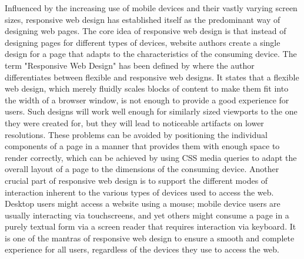 Influenced by the increasing use of mobile devices and their vastly varying screen sizes, responsive web design has established itself as the predominant way of designing web pages. 
The core idea of responsive web design is that instead of designing pages for different types of devices, website authors create a single design for a page that adapts to the characteristics of the consuming device. 
The term "Responsive Web Design" has been defined by \cite{ResponsiveWebDesign} where the author differentiates between flexible and responsive web designs. 
It states that a flexible web design, which merely fluidly scales blocks of content to make them fit into the width of a browser window, is not enough to provide a good experience for users. 
Such designs will work well enough for similarly sized viewports to the one they were created for, but they will lead to noticeable artifacts on lower resolutions. 
These problems can be avoided by positioning the individual components of a page in a manner that provides them with enough space to render correctly, which can be achieved by using CSS media queries to adapt the overall layout of a page to the dimensions of the consuming device. 
Another crucial part of responsive web design is to support the different modes of interaction inherent to the various types of devices used to access the web. 
Desktop users might access a website using a mouse; mobile device users are usually interacting via touchscreens, and yet others might consume a page in a purely textual form via a screen reader that requires interaction via keyboard. 
It is one of the mantras of responsive web design to ensure a smooth and complete experience for all users, regardless of the devices they use to access the web. 